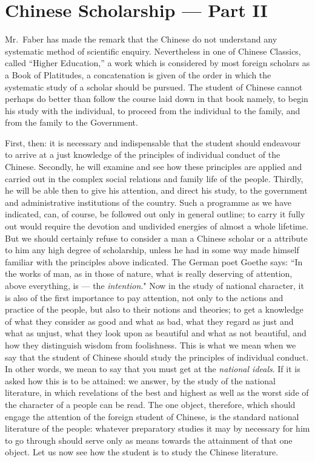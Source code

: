 \chapter{Chinese Scholarship --- Part II}
Mr.~Faber has made the remark that the Chinese do not understand any systematic method of scientific enquiry.
Nevertheless in one of Chinese Classics, called ``Higher Education,''\cite{num26}  a work which is considered by most foreign scholars as a Book of Platitudes, a concatenation is given of the order in which the systematic study of a scholar should be pursued.
The student of Chinese cannot perhaps do better than follow the course laid down in that book namely, to begin his study  with the individual, to proceed from the individual to the family, and from the family to the Government. 

First, then: it is necessary and indispensable that the student should endeavour to arrive at a just knowledge of the principles of individual conduct of the Chinese.
Secondly, he will examine and see how these principles are applied and carried out in the complex social relations and family life of the people.
Thirdly, he will be able then to give his attention, and direct his study, to the government and administrative institutions of the country.
Such a programme as we have indicated, can, of course, be followed out only in general outline; to carry it fully out would require the devotion and undivided energies of almost a whole lifetime.
But we should certainly refuse to consider a man a Chinese scholar or a attribute to him any high degree of scholarship, unless he had in some way made himself familiar with the principles above indicated.
The German poet Goethe says: ``In the works of man, as in those of nature, what is really deserving of attention, above everything, is --- the \emph{intention}."
Now in the study of national character, it is also of the first importance to pay attention, not only to the actions and practice of the people, but also to their notions and theories; to get a knowledge of what they consider as good and what as bad, what they regard as just and what as unjust, what they look upon as beautiful and what as not beautiful, and how they distinguish wisdom from foolishness.
This is what we mean when we say that the student of Chinese should study the principles of individual conduct.
In other words, we mean to say that you must get at the \emph{national ideals}.
If it is asked how this is to be attained: we answer, by the study of the national literature, in which revelations of the best and highest as well as the worst side of the character of a people can be read.
The one object, therefore, which should engage the attention of the foreign student of Chinese, is the standard national literature of the people: whatever preparatory studies it may by necessary for him to go through should serve only as means towards the attainment of that one object.
Let us now see how the student is to study the Chinese literature.

